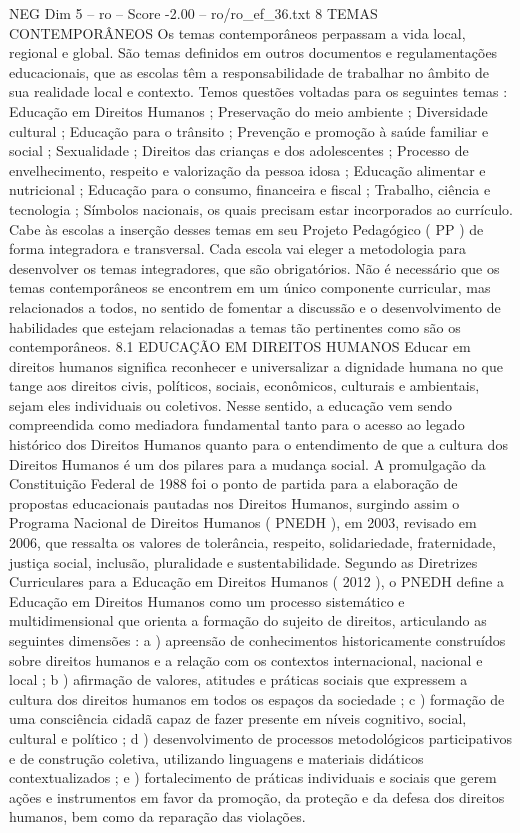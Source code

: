 \begin{textsample}{NEG Dim 5 – ro – Score -2.00 – ro/ro\_ef\_36.txt}  \label{ex:f5_neg_171}
8 TEMAS CONTEMPORÂNEOS Os temas contemporâneos perpassam a vida local, regional e global.
São temas definidos em outros documentos e regulamentações educacionais, que as escolas têm a responsabilidade de trabalhar no âmbito de sua realidade local e contexto.
Temos questões voltadas para os seguintes temas : Educação em Direitos Humanos ; Preservação do meio ambiente ; Diversidade cultural ; Educação para o trânsito ; Prevenção e promoção à saúde familiar e social ; Sexualidade ; Direitos das crianças e dos adolescentes ; Processo de envelhecimento, respeito e valorização da pessoa idosa ; Educação alimentar e nutricional ; Educação para o consumo, financeira e fiscal ; Trabalho, ciência e tecnologia ; Símbolos nacionais, os quais precisam estar incorporados ao currículo.
Cabe às escolas a inserção desses temas em seu Projeto Pedagógico ( PP ) de forma integradora e transversal.
Cada escola vai eleger a metodologia para desenvolver os temas integradores, que são obrigatórios.
Não é necessário que os temas contemporâneos se encontrem em um único componente curricular, mas relacionados a todos, no sentido de fomentar a discussão e o desenvolvimento de habilidades que estejam relacionadas a temas tão pertinentes como são os contemporâneos. 8.1 EDUCAÇÃO EM DIREITOS HUMANOS Educar em direitos humanos significa reconhecer e universalizar a dignidade humana no que tange aos direitos civis, políticos, sociais, econômicos, culturais e ambientais, sejam eles individuais ou coletivos.
Nesse sentido, a educação vem sendo compreendida como mediadora fundamental tanto para o acesso ao legado histórico dos Direitos Humanos quanto para o entendimento de que a cultura dos Direitos Humanos é um dos pilares para a mudança social.
A promulgação da Constituição Federal de 1988 foi o ponto de partida para a elaboração de propostas educacionais pautadas nos Direitos Humanos, surgindo assim o Programa Nacional de Direitos Humanos ( PNEDH ), em 2003, revisado em 2006, que ressalta os valores de tolerância, respeito, solidariedade, fraternidade, justiça social, inclusão, pluralidade e sustentabilidade.
Segundo as Diretrizes Curriculares para a Educação em Direitos Humanos ( 2012 ), o PNEDH define a Educação em Direitos Humanos como um processo sistemático e multidimensional que orienta a formação do sujeito de direitos, articulando as seguintes dimensões : a ) apreensão de conhecimentos historicamente construídos sobre direitos humanos e a relação com os contextos internacional, nacional e local ; b ) afirmação de valores, atitudes e práticas sociais que expressem a cultura dos direitos humanos em todos os espaços da sociedade ; c ) formação de uma consciência cidadã capaz de fazer presente em níveis cognitivo, social, cultural e político ; d ) desenvolvimento de processos metodológicos participativos e de construção coletiva, utilizando linguagens e materiais didáticos contextualizados ; e ) fortalecimento de práticas individuais e sociais que gerem ações e instrumentos em favor da promoção, da proteção e da defesa dos direitos humanos, bem como da reparação das violações.

\end{textsample}
